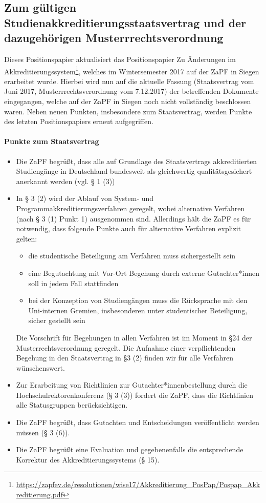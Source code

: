 
\subsection*{Zum gültigen Studienakkreditierungsstaatsvertrag und der dazugehörigen Musterrrechtsverordnung}
Dieses Positionspapier aktualisiert das Positionspapier \glqq Zu Änderungen im Akkreditierungssystem\grqq\footnote{\url{https://zapfev.de/resolutionen/wise17/Akkreditierung\_PosPap/Pospap\_Akkreditierung.pdf}}, welches im Wintersemester 2017 auf der ZaPF in Siegen erarbeitet wurde. Hierbei wird nun auf die aktuelle Fassung (Staatsvertrag vom Juni 2017, Musterrrechtsverordnung vom 7.12.2017) der betreffenden Dokumente eingegangen, welche auf der ZaPF in Siegen noch nicht vollständig beschlossen waren. Neben neuen Punkten, insbesondere zum Staatsvertrag, werden Punkte des letzten Positionspapiers erneut aufgegriffen.

\paragraph{Punkte zum Staatsvertrag}
\begin{itemize}
  \item Die ZaPF begrüßt, dass alle auf Grundlage des Staatsvertrags akkreditierten Studiengänge in Deutschland bundesweit als gleichwertig qualitätsgesichert anerkannt werden (vgl. § 1 (3))
  \item In § 3 (2) wird der Ablauf von System- und Programmakkreditierungsverfahren geregelt, wobei alternative Verfahren (nach § 3 (1) Punkt 1) ausgenommen sind. Allerdings hält die ZaPF es für notwendig, dass folgende Punkte auch für alternative Verfahren explizit gelten: %
  \begin{itemize}
      \item die studentische Beteiligung am Verfahren muss sichergestellt sein
      \item eine Begutachtung mit Vor-Ort Begehung durch externe Gutachter*innen soll in jedem Fall stattfinden
      \item bei der Konzeption von Studiengängen muss die Rücksprache mit den Uni-internen Gremien, insbesonderen unter studentischer Beteiligung, sicher gestellt sein
   \end{itemize}
      Die Vorschrift für Begehungen in allen Verfahren ist im Moment in §24 der Musterrechtsverordnung geregelt. Die Aufnahme einer verpflichtenden Begehung in den Staatsvertrag in §3 (2) finden wir für alle Verfahren wünschenswert.
  \item Zur Erarbeitung von Richtlinien zur Gutachter*innenbestellung durch die Hochschulrektorenkonferenz (§ 3 (3)) fordert die ZaPF, dass die Richtlinien alle Statusgruppen berücksichtigen.
  \item Die ZaPF begrüßt, dass Gutachten und Entscheidungen veröffentlicht werden müssen (§ 3 (6)).
  \item Die ZaPF begrüßt eine Evaluation und gegebenenfalls die entsprechende Korrektur des Akkreditierungssystems (§ 15).
\end{itemize}

